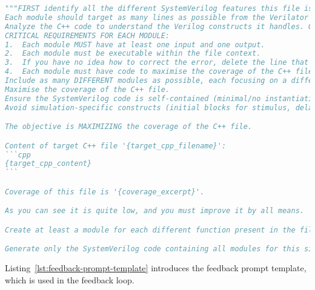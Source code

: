 \begin{lstlisting}[language=python,caption={initial prompt template},label={lst:initial-prompt-template},breaklines=true]
"""FIRST identify all the different SystemVerilog features this file is supposed to handle or simulate. THEN Once you identified all the features, that are specific to this file then generate a single SystemVerilog file containing MULTIPLE, modules.
Each module should target as many lines as possible from the Verilator C++ file '{target_cpp_filename}' (content provided below).
Analyze the C++ code to understand the Verilog constructs it handles. Generate complex but valid SystemVerilog snippets using these constructs, maximising the coverage of the C++ file.
CRITICAL REQUIREMENTS FOR EACH MODULE:
1.  Each module MUST have at least one input and one output.
2.  Each module must be executable within the file context.
3.  If you have no idea how to correct the error, delete the line that is problematic.
4.  Each module must have code to maximise the coverage of the C++ file.
Include as many DIFFERENT modules as possible, each focusing on a different feature this C++ file is supposed to handle.
Maximise the coverage of the C++ file.
Ensure the SystemVerilog code is self-contained (minimal/no instantiations) and syntactically correct.
Avoid simulation-specific constructs (initial blocks for stimulus, delays, $finish, $display).

The objective is MAXIMIZING the coverage of the C++ file.

Content of target C++ file '{target_cpp_filename}':
```cpp
{target_cpp_content}
```

Coverage of this file is '{coverage_excerpt}'.

As you can see it is quite low, and you must improve it by all means.

Create at least a module for each different function present in the file.

Generate only the SystemVerilog code containing all modules for this single file."""
\end{lstlisting}

Listing~\ref{lst:feedback-prompt-template} introduces the feedback prompt template, which is used in the feedback loop.

